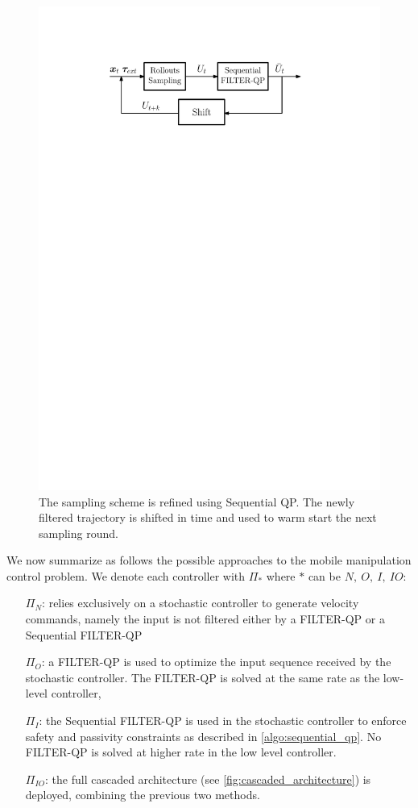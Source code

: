 \begin{figure}[t]
\centering
\includegraphics[width=0.8\columnwidth]{figures/schemes/stochastic_controller.pdf}
\caption{The sampling scheme is refined using Sequential QP. The newly filtered trajectory is shifted in time and used to warm start the next sampling round.} \label{fig:sampling_scheme}
\end{figure}

We now summarize as follows the possible approaches to the mobile manipulation control problem. We denote each controller with $\Pi_{*}$ where $*$ can be $N,\ O,\ I,\ IO$:
\begin{itemize}
    \item[$\Pi_{N}$:] relies exclusively on a stochastic controller to generate velocity commands, namely the input is not filtered either by a FILTER-QP or a Sequential FILTER-QP
    \item[$\Pi_{O}$:] a FILTER-QP is used to optimize the input sequence received by the stochastic controller. The FILTER-QP is solved at the same rate as the low-level controller,
    \item[$\Pi_{I}$:] the Sequential FILTER-QP is used in the stochastic controller to enforce safety and passivity constraints  as described in \algo \ref{algo:sequential_qp}. No FILTER-QP is solved at higher rate in the low level controller.
    \item[$\Pi_{IO}$:] the full cascaded architecture (see \fig \ref{fig:cascaded_architecture}) is deployed, combining the previous two methods.
\end{itemize}
